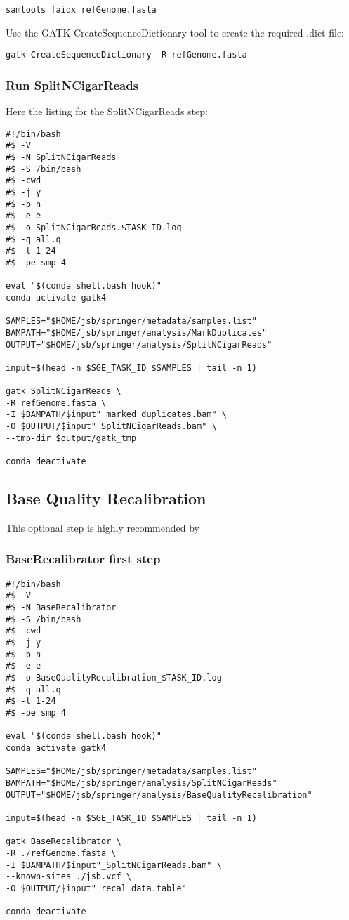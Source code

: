 \begin{verbatim}
samtools faidx refGenome.fasta
\end{verbatim}

Use the GATK CreateSequenceDictionary tool to create the required .dict file:

\begin{verbatim}
gatk CreateSequenceDictionary -R refGenome.fasta
\end{verbatim}

\subsubsection{Run SplitNCigarReads}

Here the listing for the SplitNCigarReads step:

\begin{verbatim}
#!/bin/bash
#$ -V
#$ -N SplitNCigarReads
#$ -S /bin/bash
#$ -cwd
#$ -j y
#$ -b n
#$ -e e
#$ -o SplitNCigarReads.$TASK_ID.log
#$ -q all.q
#$ -t 1-24
#$ -pe smp 4

eval "$(conda shell.bash hook)"
conda activate gatk4

SAMPLES="$HOME/jsb/springer/metadata/samples.list"
BAMPATH="$HOME/jsb/springer/analysis/MarkDuplicates"
OUTPUT="$HOME/jsb/springer/analysis/SplitNCigarReads"

input=$(head -n $SGE_TASK_ID $SAMPLES | tail -n 1)

gatk SplitNCigarReads \
-R refGenome.fasta \
-I $BAMPATH/$input"_marked_duplicates.bam" \
-O $OUTPUT/$input"_SplitNCigarReads.bam" \
--tmp-dir $output/gatk_tmp

conda deactivate
\end{verbatim}




\subsection{Base Quality Recalibration}

This optional step is highly recommended by 


\subsubsection{BaseRecalibrator first step}
\begin{verbatim}
#!/bin/bash
#$ -V
#$ -N BaseRecalibrator
#$ -S /bin/bash
#$ -cwd
#$ -j y
#$ -b n
#$ -e e
#$ -o BaseQualityRecalibration_$TASK_ID.log
#$ -q all.q
#$ -t 1-24
#$ -pe smp 4

eval "$(conda shell.bash hook)"
conda activate gatk4

SAMPLES="$HOME/jsb/springer/metadata/samples.list"
BAMPATH="$HOME/jsb/springer/analysis/SplitNCigarReads"
OUTPUT="$HOME/jsb/springer/analysis/BaseQualityRecalibration"

input=$(head -n $SGE_TASK_ID $SAMPLES | tail -n 1)

gatk BaseRecalibrator \
-R ./refGenome.fasta \
-I $BAMPATH/$input"_SplitNCigarReads.bam" \
--known-sites ./jsb.vcf \
-O $OUTPUT/$input"_recal_data.table"

conda deactivate
\end{verbatim}


